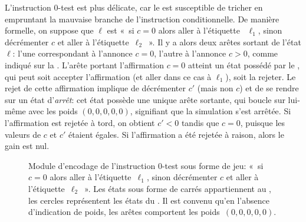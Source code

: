 L'instruction $0$-test est plus délicate, car le \jo est susceptible de tricher en empruntant la mauvaise branche de l'instruction conditionnelle.
De manière formelle, on suppose que $\ell$ est « si $c=0$ alors aller à l'étiquette~ $\ell_1$, sinon décrémenter $c$ et aller à l'étiquette~$\ell_2$ ».
Il y a alors deux arêtes sortant de l'état $\ell$: l'une correspondant à l'annonce $c=0$, l'autre à l'annonce $c>0$, comme indiqué sur la .
L'arête portant l'affirmation $c=0$ atteint un état possédé par le \ji, qui peut soit accepter l'affirmation (et aller dans ce cas à $\ell_1$), soit la rejeter.
Le rejet de cette affirmation implique de décrémenter $c'$ (mais non $c$) et de se rendre sur un état d'\emph{arrêt}: cet état possède une unique arête sortante, qui boucle sur lui-même avec les poids $(0,0,0,0,0)$, signifiant que la simulation s'est arrêtée.
Si l'affirmation est rejetée à tord, on obtient $c'<0$ tandis que $c=0$, puisque les valeurs de $c$ et $c'$ étaient égales.
Si l'affirmation a été rejetée à raison, alors le gain est nul.

\begin{figure}
\centering
{}
\caption[Module d'encodage de l'instruction $0$-test sous forme de jeu.]{Module d'encodage de l'instruction $0$-test sous forme de jeu: « si $c=0$ alors aller à l'étiquette~$\ell_1$, sinon décrémenter $c$ et aller à l'étiquette~$\ell_2$ ». Les états sous forme de carrés appartiennent au \jo, les cercles représentent les états du \ji. Il est convenu qu'en l'absence d'indication de poids, les arêtes comportent les poids~$(0,0,0,0,0)$.}
\label{tj:fig:zerotest}
\end{figure}

